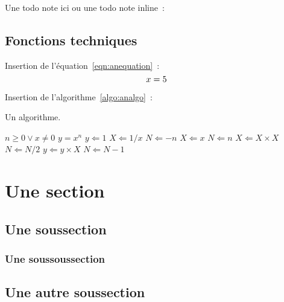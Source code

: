Une todo note ici ou une todo note inline~: 

\subsection{Fonctions techniques}

Insertion de l'équation~\ref{eqn:anequation}~:
\begin{equation}
\label{eqn:anequation}
x = 5
\myequations{My equation}
\end{equation}


Insertion de l'algorithme~\ref{algo:analgo}~:
\begin{algorithm}[H]
\caption{\label{algo:analgo}Un algorithme.}
\begin{algorithmic}[1]
\REQUIRE $n \geq 0 \vee x \neq 0$
    \ENSURE $y = x^n$
    \STATE $y \Leftarrow 1$
        \STATE $X \Leftarrow 1 / x$
        \STATE $N \Leftarrow -n$
    \ELSE
        \STATE $X \Leftarrow x$
        \STATE $N \Leftarrow n$
    \ENDIF
            \STATE $X \Leftarrow X \times X$
            \STATE $N \Leftarrow N / 2$
        \ELSE[$N$ is odd]
            \STATE $y \Leftarrow y \times X$
            \STATE $N \Leftarrow N - 1$
        \ENDIF
    \ENDWHILE
\end{algorithmic}
\end{algorithm}

\section{Une section}


\subsection{Une sous\tiret section}

\subsubsection{Une sous\tiret sous\tiret section}



\lipsum[4-8]



\subsection{Une autre sous\tiret section}

